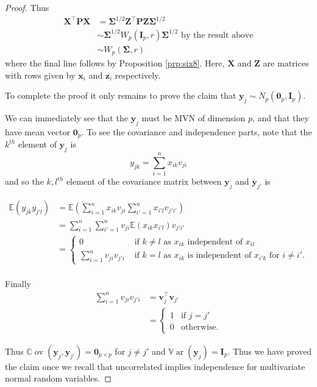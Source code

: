 \documentclass[
]{book}
\theoremstyle{definition}
\theoremstyle{definition}
\theoremstyle{definition}
\theoremstyle{definition}
\theoremstyle{remark}
\begin{document}
\begin{proof}
Thus
\begin{align*}
\mathbf X^\top \mathbf P\mathbf X&= \boldsymbol{\Sigma}^{1/2} \mathbf Z^\top\mathbf P\mathbf Z\boldsymbol{\Sigma}^{1/2}\\
&\sim \boldsymbol{\Sigma}^{1/2} W_p(\mathbf I_p, r) \boldsymbol{\Sigma}^{1/2} \mbox{ by the result above}\\
&\sim W_p(\boldsymbol{\Sigma}, r)
\end{align*}
where the final line follows by Proposition \ref{prp:six8}. Here,
\(\mathbf X\) and \(\mathbf Z\) are matrices with rows given by \(\mathbf x_i\) and \(\mathbf z_i\) respectively.

To complete the proof it only remains to prove the claim that
\(\mathbf y_j \sim N_p({\mathbf 0}_p, \mathbf I_p).\)

We can immediately see that the \(\mathbf y_j\) must be MVN of dimension \(p\), and that they have mean vector \({\boldsymbol 0}_p\). To see the covariance and independence parts, note that the \(k^{th}\) element of \(\mathbf y_j\) is
\[y_{jk} = \sum_{i=1}^n  x_{ik}v_{ji}\]
and so the \(k, l^{th}\) element of the covariance matrix between \(\mathbf y_j\) and \(\mathbf y_{j'}\) is

\begin{align*}
{\mathbb{E}}(y_{jk} y_{j'l}) &= {\mathbb{E}}(\sum_{i=1}^n  x_{ik}v_{ji} \sum_{i'=1}^n  x_{i'l}v_{j'i'})\\
&=\sum_{i=1}^n\sum_{i'=1}^n v_{ji} {\mathbb{E}}(x_{ik}x_{i'l})v_{j'i'}\\
&=\begin{cases}
0 &\mbox{ if } k\not = l \mbox{ as } x_{ik} \mbox{ independent of } x_{il} \\
\sum_{i=1}^n v_{ji} v_{j'i} &\mbox{ if } k=l\mbox{ as }x_{ik} \mbox{ is independent of } x_{i'k} \mbox{ for }i\not=i'.
\end{cases}\\
\end{align*}

Finally
\begin{align*}
\sum_{i=1}^n v_{ji} v_{j'i}&= \mathbf v_j^\top \mathbf v_{j'}\\
&=\begin{cases}
1 &\mbox{if } j=j'\\
0 &\mbox{otherwise}.
\end{cases}
\end{align*}

Thus \({\mathbb{C}\operatorname{ov}}(\mathbf y_j, \mathbf y_{j'}) = {\boldsymbol 0}_{p\times p}\) for \(j\not = j'\) and \({\mathbb{V}\operatorname{ar}}(\mathbf y_j) = \mathbf I_p\). Thus we have proved the claim once we recall that uncorrelated implies independence for multivariate normal random variables.
\end{proof}
\end{document}
